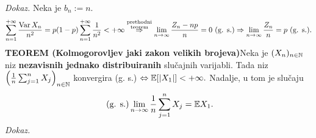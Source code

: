 \documentclass{article}
\newcommand{\Var}{\operatorname{Var}}
\begin{document}
\textit{Dokaz.}\newline
Neka je \(b_n:=n.\) \[\sum_{n=1}^{+\infty}\frac{\Var X_n}{n^2}=p(1-p)\sum_{n=1}^{+\infty}\frac1{n^2}<+\infty\\\overset{\substack{\text{prethodni}\\\text{teorem}}}{\Rightarrow}\lim_{n\to\infty}\frac{Z_n-np}n=0\text{ (g. s.)}\Rightarrow\lim_{n\to\infty}\frac{Z_n}n=p\text{ (g. s.)}.\]
\textbf{TEOREM (Kolmogorovljev jaki zakon velikih brojeva)}\newline Neka je \((X_n)_{n\in\Bbb N}\) niz \textbf{nezavisnih jednako distribuiranih} slučajnih varijabli. Tada niz \(\left(\frac1n\sum_{j=1}^nX_j\right)_{n\in\Bbb N}\) konvergira (g. s.) \(\Leftrightarrow\Bbb E[|X_1|]<+\infty.\) Nadalje, u tom je slučaju \[\text{ (g. s.)}\lim_{n\to\infty}\frac1n\sum_{j=1}^nX_j=\Bbb EX_1.\]
\textit{Dokaz.}
\end{document}
